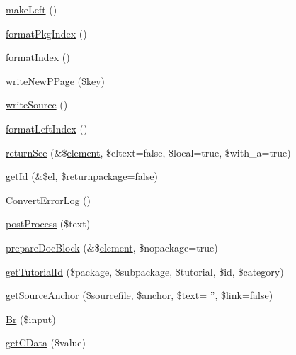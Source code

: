 \begin{DoxyCompactItemize}
\hyperlink{class_x_m_l_doc_bookpeardoc2_converter_aad3f0d3857e7995a1ede44d9b901e2d4}{make\-Left} ()
\item 
\hyperlink{class_x_m_l_doc_bookpeardoc2_converter_a37200c9f589ee4eaeed637c5ce1af356}{format\-Pkg\-Index} ()
\item 
\hyperlink{class_x_m_l_doc_bookpeardoc2_converter_a963f73984fad30cb1776cd293eeb7db7}{format\-Index} ()
\item 
\hyperlink{class_x_m_l_doc_bookpeardoc2_converter_a6b7e21b9959092d614a9c07a447c2643}{write\-New\-P\-Page} (\$key)
\item 
\hyperlink{class_x_m_l_doc_bookpeardoc2_converter_a86e08bed62e444fd37ebd8927308be29}{write\-Source} ()
\item 
\hyperlink{class_x_m_l_doc_bookpeardoc2_converter_a39bb30299ec5d6ba31096e51f2bcc4b4}{format\-Left\-Index} ()
\item 
\hyperlink{class_x_m_l_doc_bookpeardoc2_converter_aabb194e1ca02651a000846412f0049ff}{return\-See} (\&\$\hyperlink{bug-904820_8php_aa94081298ab2dfd0f261cce6c203d9aa}{element}, \$eltext=false, \$local=true, \$with\-\_\-a=true)
\item 
\hyperlink{class_x_m_l_doc_bookpeardoc2_converter_a1f0ec5b7853f8cc02386736d19b64371}{get\-Id} (\&\$el, \$returnpackage=false)
\item 
\hyperlink{class_x_m_l_doc_bookpeardoc2_converter_a5a02e88d6dba03b66f46fd411e5ac2c2}{\-Convert\-Error\-Log} ()
\item 
\hyperlink{class_x_m_l_doc_bookpeardoc2_converter_a0b2058070d303b4d06535be248b021ab}{post\-Process} (\$text)
\item 
\hyperlink{class_x_m_l_doc_bookpeardoc2_converter_a51865de1c35df577a5f62a586a9eebcd}{prepare\-Doc\-Block} (\&\$\hyperlink{bug-904820_8php_aa94081298ab2dfd0f261cce6c203d9aa}{element}, \$nopackage=true)
\item 
\hyperlink{class_x_m_l_doc_bookpeardoc2_converter_afd1583b73afa3c7fb9c72322d7bb0d9a}{get\-Tutorial\-Id} (\$package, \$subpackage, \$tutorial, \$id, \$category)
\item 
\hyperlink{class_x_m_l_doc_bookpeardoc2_converter_a0cc7c24f111109ea1d8559681ecd6b77}{get\-Source\-Anchor} (\$sourcefile, \$anchor, \$text= '', \$link=false)
\item 
\hyperlink{class_x_m_l_doc_bookpeardoc2_converter_aa66072c1b7a54fd74e4e04eaf93f6364}{\-Br} (\$input)
\item 
\hyperlink{class_x_m_l_doc_bookpeardoc2_converter_a37fe6f6ddd1cd15d360788064dce7a43}{get\-C\-Data} (\$value)
\item 

\end{DoxyCompactItemize}
